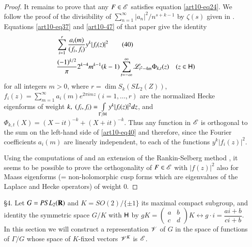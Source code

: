 \begin{proof}
It remains to prove that any $F \in \mathscr{E}$ satisfies equation \eqref{art10-eq24}. We follow the proof of the divisibility of $\sum\limits^\infty_{n=1} |a_n|^2 / n^{s+k-1}$ by $\zeta(s)$ given in \cite{art10-11}. Equations \eqref{art10-eq37} and \eqref{art10-47} of that paper give the identity
\begin{align*}
&\sum\limits^r_{i=1} \frac{a_i(m)}{(f_i, f_i)} y^k |f_i (z)|^2 \tag{40} \label{art10-40}\\
& \frac{(-1)^{k/2}}{\pi} 2^{k-4} m^{k-1} (k-1) \sum\limits^\infty_{t = - \infty} \mathscr{L}_{t^2 - 4 m} \Phi_{k,t} (z) \quad (z \in \mathsf{H})
\end{align*}
for all integers $m > 0$, where $r = \dim S_k (SL_2 (Z))$, $f_i(z)  =\sum\limits^\infty_{m=1} a_i (m) e^{2 \pi i m z} (i = 1, \ldots, r)$ are the normalized Hecke eigenforms of weight $k,\;(f_i, f_i) = \int\limits_{\Gamma / \mathsf{H}} y^k |f_i(z)|^2 dz$, and $\Phi_{k,t} (X) = (X - it)^{-k} + (X + it)^{-k}$. Thus any function in $\mathscr{E}$ is orthogonal to the sum on the left-hand side of \eqref{art10-eq40} and therefore, since the Fourier coefficients $a_i(m)$ are linearly independent, to each of the functions $y^k |f_i(z)|^2$.

Using the computations of \cite{art10-12} and an extension of the Rankin-Selberg method \cite{art10-13} , it seems to be possible to prove the orthogonality of $F \in \mathscr{E}$ with $|f(z)|^2$ also for Maass eigenforms (= non-holomorphic cusp forms which are eigenvalues of the Laplace and Hecke operators) of weight 0.
\end{proof}

\S 4. Let $G = PSL_2 (\mathbf{R})$ and $K = SO (2) / \{\pm 1\}$ its maximal compact subgroup, and identity the symmetric space $G/ K$ with $\mathsf{H}$ by $gK = \left(\begin{matrix}
a & b \\
 c & d
\end{matrix}\right)K \leftrightarrow g \cdot i = \dfrac{ai + b}{ci+b}$. In this section we will construct a representation $\mathscr{V}$ of $G$ in the space of functions of $\Gamma / G$ whose space of $K$-fixed vectors $\mathscr{V}^K$ is $\mathscr{E}$.

